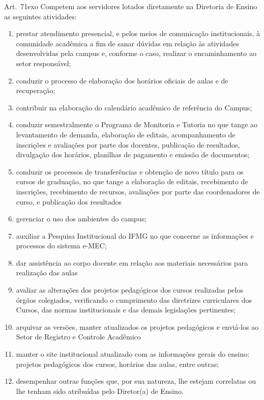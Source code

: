 \documentclass[a4paper,12pt]{report}
\newcommand{\ORD}[2]{#1\raise1ex\hbox{\scriptsize#2}}
\begin{document}
Art.~\ORD{7}{o} Competem aos servidores lotados diretamente na Diretoria de Ensino as seguintes atividades:

\begin{enumerate}
\renewcommand{\labelenumi}{\Roman{enumi}}

\item prestar atendimento presencial, e pelos meios de comunicação institucionais, à  
      comunidade acadêmica a fim de sanar dúvidas em relação às atividades desenvolvidas pela campus e, conforme o caso, realizar o encaminhamento ao setor responsável;

\item conduzir o processo de elaboração dos horários oficiais de aulas e de recuperação;

\item contribuir na elaboração do calendário acadêmico de referência do Campus;

\item conduzir semestralmente o Programa de Monitoria e Tutoria no que tange ao 
      levantamento de demanda, elaboração de editais, acompanhamento de inscrições e avaliações por parte dos docentes, publicação de resultados, divulgação dos horários, planilhas de pagamento e emissão de documentos;
      
\item conduzir os processos de transferências e obtenção de novo título para os cursos de        graduação, no que tange a elaboração de editais, recebimento de inscrições,  
      recebimento de recursos, avaliações por parte das coordenadores de curso, e publicação dos resultados

\item gerenciar o uso dos ambientes do campus;

\item auxiliar a Pesquisa Institucional do IFMG no que concerne as informações e processos       do sistema e-MEC;

\item dar assistência ao corpo docente em relação aos materiais necessários para realização       das aulas

\item avaliar as alterações dos projetos pedagógicos dos cursos realizadas pelos órgãos          colegiados, verificando o cumprimento das diretrizes curriculares dos Cursos, das 
      normas institucionais e das demais legislações pertinentes;

\item arquivar as versões, manter atualizados os projetos pedagógicos e enviá-los ao Setor       de Registro e Controle Acadêmico

\item manter o site institucional atualizado com as informações gerais do ensino: projetos 
      pedagógicos dos cursos, horários das aulas, entre outras;

\item desempenhar outras funções que, por sua natureza, lhe estejam correlatas ou lhe  
      tenham sido atribuídas pelo Diretor(a) de Ensino.
\end{enumerate}
\end{document}
